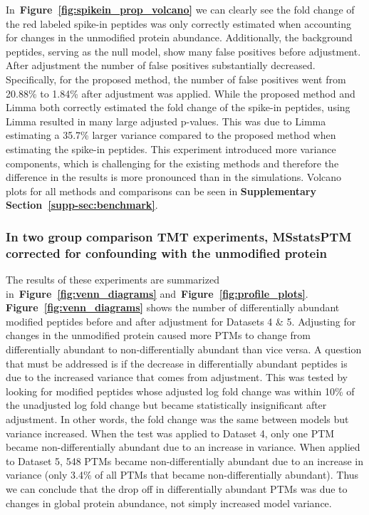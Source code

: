 \documentclass[mcp]{article}
\numberwithin{table}{section}
\def\figref#1{{\bf Figure~\ref{fig:#1}}}
\begin{document}
In~\figref{spikein_prop_volcano} we can clearly see the fold change of the red labeled spike-in peptides was only correctly estimated when accounting for changes in the unmodified protein abundance. Additionally, the background peptides, serving as the null model, show many false positives before adjustment. After adjustment the number of false positives substantially decreased. Specifically, for the proposed method, the number of false positives went from 20.88\% to 1.84\% after adjustment was applied. While the proposed method and Limma both correctly estimated the fold change of the spike-in peptides, using Limma resulted in many large adjusted p-values. This was due to Limma estimating a 35.7\% larger variance compared to the proposed method when estimating the spike-in peptides. This experiment introduced more variance components, which is challenging for the existing methods and therefore the difference in the results is more pronounced than in the simulations. Volcano plots for all methods and comparisons can be seen in {\bf Supplementary Section~\ref{supp-sec:benchmark}}.

\subsubsection*{In two group comparison TMT experiments, MSstatsPTM corrected for confounding with the unmodified protein}

The results of these experiments are summarized in~\figref{venn_diagrams} and~\figref{profile_plots}. \figref{venn_diagrams} shows the number of differentially abundant modified peptides before and after adjustment for Datasets 4 \& 5. Adjusting for changes in the unmodified protein caused more PTMs to change from differentially abundant to non-differentially abundant than vice versa. A question that must be addressed is if the decrease in differentially abundant peptides is due to the increased variance that comes from adjustment. This was tested by looking for modified peptides whose adjusted log fold change was within 10\% of the unadjusted log fold change but became statistically insignificant after adjustment. In other words, the fold change was the same between models but variance increased. When the test was applied to Dataset 4, only one PTM became non-differentially abundant due to an increase in variance. When applied to Dataset 5, 548 PTMs became non-differentially abundant due to an increase in variance (only 3.4\% of all PTMs that became non-differentially abundant). Thus we can conclude that the drop off in differentially abundant PTMs was due to changes in global protein abundance, not simply increased model variance.
\end{document}
